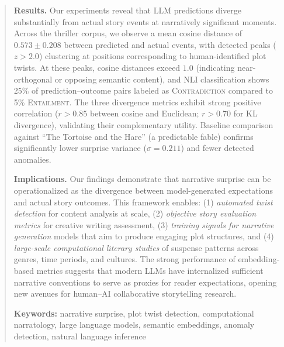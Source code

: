 \documentclass[12pt]{article}
\begin{document}
\begin{abstract}
\vspace{0.5em}
\noindent
\textbf{Results.}
Our experiments reveal that LLM predictions diverge substantially from actual story events at narratively significant moments. Across the thriller corpus, we observe a mean cosine distance of $0.573 \pm 0.208$ between predicted and actual events, with detected peaks ($z > 2.0$) clustering at positions corresponding to human-identified plot twists. At these peaks, cosine distances exceed $1.0$ (indicating near-orthogonal or opposing semantic content), and NLI classification shows 25\% of prediction--outcome pairs labeled as \textsc{Contradiction} compared to 5\% \textsc{Entailment}. The three divergence metrics exhibit strong positive correlation ($r > 0.85$ between cosine and Euclidean; $r > 0.70$ for KL divergence), validating their complementary utility. Baseline comparison against ``The Tortoise and the Hare'' (a predictable fable) confirms significantly lower surprise variance ($\sigma = 0.211$) and fewer detected anomalies.

\vspace{0.5em}
\noindent
\textbf{Implications.}
Our findings demonstrate that narrative surprise can be operationalized as the divergence between model-generated expectations and actual story outcomes. This framework enables: (1) \emph{automated twist detection} for content analysis at scale, (2) \emph{objective story evaluation metrics} for creative writing assessment, (3) \emph{training signals for narrative generation} models that aim to produce engaging plot structures, and (4) \emph{large-scale computational literary studies} of suspense patterns across genres, time periods, and cultures. The strong performance of embedding-based metrics suggests that modern LLMs have internalized sufficient narrative conventions to serve as proxies for reader expectations, opening new avenues for human--AI collaborative storytelling research.

\vspace{1em}
\noindent
\textbf{Keywords:} narrative surprise, plot twist detection, computational narratology, large language models, semantic embeddings, anomaly detection, natural language inference
\end{abstract}
\end{document}
